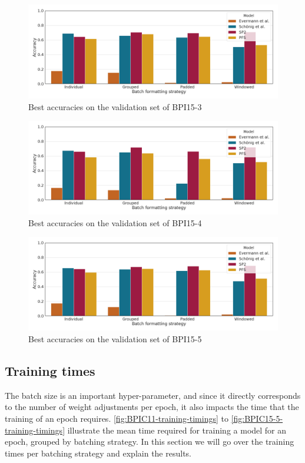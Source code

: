 \begin{figure}
    \centering
    \includegraphics[width=\textwidth]{gfx/bpic2015_3/accuracies.png}
    \caption{Best accuracies on the validation set of BPI15-3}
    \label{fig:max-accuracies-bpic2015-3}
\end{figure}
\begin{figure}
    \centering
    \includegraphics[width=\textwidth]{gfx/bpic2015_4/accuracies.png}
    \caption{Best accuracies on the validation set of BPI15-4}
    \label{fig:max-accuracies-bpic2015-4}
\end{figure}
\begin{figure}
    \centering
    \includegraphics[width=\textwidth]{gfx/bpic2015_5/accuracies.png}
    \caption{Best accuracies on the validation set of BPI15-5}
    \label{fig:max-accuracies-bpic2015-5}
\end{figure}
\FloatBarrier

\subsection*{Training times}
The batch size is an important hyper-parameter, and since it directly corresponds to the number of weight adjustments per epoch, it also impacts the time that the training of an epoch requires. \autoref{fig:BPIC11-training-timings} to \autoref{fig:BPIC15-5-training-timings} illustrate the mean time required for training a model for an epoch, grouped by batching strategy.
In this section we will go over the training times per batching strategy and explain the results.

